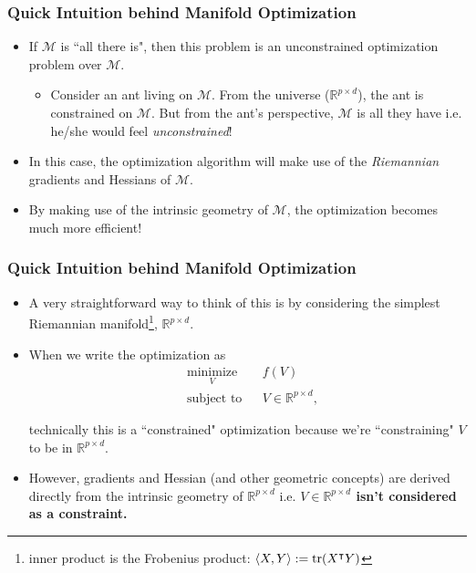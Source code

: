 \documentclass{beamer}
\begin{document}
\begin{frame}
	\frametitle{Quick Intuition behind Manifold Optimization}
	\begin{itemize}
		\item If $\mathcal{M}$ is ``all there is", then this problem is an unconstrained optimization problem over $\mathcal{M}$.
		\begin{itemize}
			\item Consider an ant living on $\mathcal{M}$. From the universe ($\mathbb{R}^{p \times d}$), the ant is constrained on $\mathcal{M}$. But from the ant's perspective, $\mathcal{M}$ is all they have i.e. he/she would feel {\it unconstrained}!
		\end{itemize}
		
		\item In this case, the optimization algorithm will make use of the {\it Riemannian} gradients and Hessians of $\mathcal{M}$.
		
		\item By making use of the intrinsic geometry of $\mathcal{M}$, the optimization becomes much more efficient!
	\end{itemize}
\end{frame}

\begin{frame}
	\frametitle{Quick Intuition behind Manifold Optimization}
	\begin{itemize}
		\item A very straightforward way to think of this is by considering the simplest Riemannian manifold\footnote{inner product is the Frobenius product: $\langle X, Y \rangle:= \tr(X^\intercal Y)$}, $\mathbb{R}^{p \times d}$.
		
		\item When we write the optimization as
		\begin{equation}
			\begin{aligned}
				& \underset{V}{\text{minimize}}
				& &  f(V) \\
				& \text{subject to}
				& & V \in \mathbb{R}^{p \times d},
			\end{aligned}
		\end{equation}
		
		technically this is a ``constrained" optimization because we're ``constraining" $V$ to be in $\mathbb{R}^{p \times d}$.
		
		\item However, gradients and Hessian (and other geometric concepts) are derived directly from the intrinsic geometry of $\mathbb{R}^{p \times d}$ i.e. {\bf $V \in \mathbb{R}^{p \times d}$ isn't considered as a constraint.}
	\end{itemize}
\end{frame}
\end{document}

